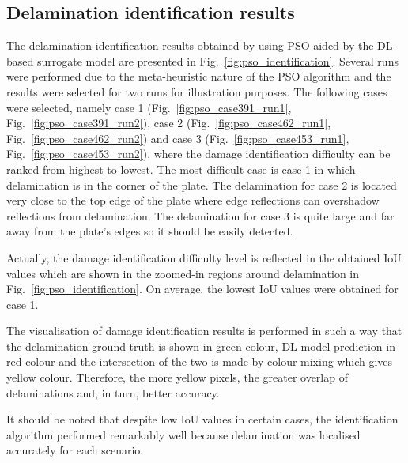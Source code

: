 \subsection{Delamination identification results}
The delamination identification results obtained by using PSO aided by the DL-based surrogate model are presented in Fig.~\ref{fig:pso_identification}.
Several runs were performed due to the meta-heuristic nature of the PSO algorithm and the results were selected for two runs for illustration purposes.
The following cases were selected, namely case 1 (Fig.~\ref{fig:pso_case391_run1}, Fig.~\ref{fig:pso_case391_run2}), case 2 (Fig.~\ref{fig:pso_case462_run1}, Fig.~\ref{fig:pso_case462_run2}) and case 3 (Fig.~\ref{fig:pso_case453_run1}, Fig.~\ref{fig:pso_case453_run2}),  where the damage identification difficulty can be ranked from highest to lowest.
The most difficult case is case 1 in which delamination is in the corner of the plate.
The delamination for case 2 is located very close to the top edge of the plate where edge reflections can overshadow reflections from delamination.
The delamination for case 3 is quite large and far away from the plate's edges so it should be easily detected.

Actually, the damage identification difficulty level is reflected in the obtained IoU values which are shown in the zoomed-in regions around delamination in Fig.~\ref{fig:pso_identification}.
On average, the lowest IoU values were obtained for case 1.

The visualisation of damage identification results is performed in such a way that the delamination ground truth is shown in green colour, DL model prediction in red colour and the intersection of the two is made by colour mixing which gives yellow colour.
Therefore, the more yellow pixels, the greater overlap of delaminations and, in turn, better accuracy.

It should be noted that despite low IoU values in certain cases, the identification algorithm performed remarkably well because delamination was localised accurately for each scenario.

